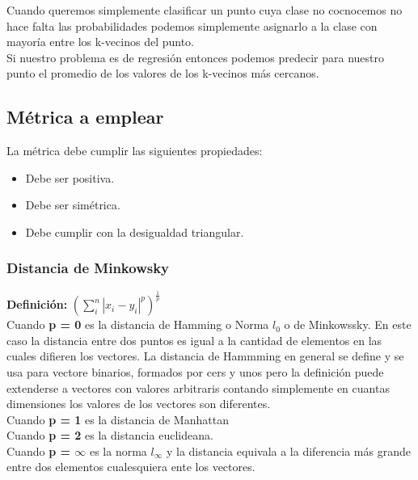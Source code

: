 \documentclass[titlepage,a4paper]{article}
\begin{document}
Cuando queremos simplemente clasificar un punto cuya clase no cocnocemos no hace falta las probabilidades podemos simplemente asignarlo a la clase con mayoría entre los k-vecinos del punto. \\

Si nuestro problema es de regresión entonces podemos predecir para nuestro punto el promedio de los valores de los k-vecinos más cercanos. 

\subsection*{Métrica a emplear}
La métrica debe cumplir las siguientes propiedades:
\begin{itemize}
\item Debe ser positiva.
\item Debe ser simétrica.
\item Debe cumplir con la desigualdad triangular.
\end{itemize}

\subsubsection*{Distancia de Minkowsky}
\textbf{Definición:} $\left(\displaystyle\sum_i^n |x_i-y_i|^p\right)^{\frac{1}{p}}$\\

Cuando \textbf{p = 0} es la distancia de Hamming o Norma $l_0$ o de Minkowssky. En este caso la distancia entre dos puntos es igual a la cantidad de elementos en las cuales difieren los vectores. La distancia de Hammming en general se define y se usa para vectore binarios, formados por cers y unos pero la definición puede extenderse a vectores con valores arbitraris contando simplemente en cuantas dimensiones los valores de los vectores son diferentes. \\

Cuando \textbf{p = 1} es la distancia de Manhattan\\

Cuando\textbf{ p = 2} es la distancia euclideana. \\

Cuando \textbf{p = $\infty$} es la norma $ l_{\infty}$ y la distancia equivala a la diferencia más grande entre dos elementos cualesquiera ente  los vectores. 
\end{document}
